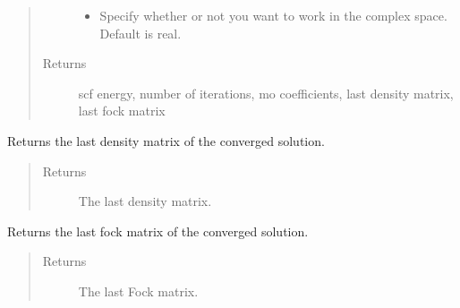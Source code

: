 \documentclass[letterpaper,10pt,english]{sphinxmanual}
\begin{document}
\begin{fulllineitems}
\begin{fulllineitems}
\begin{quote}
\begin{description}
\begin{itemize}
\item {} 
 \textendash{} Specify whether or not you want to work in the complex space. Default is real.

\end{itemize}

\item[{Returns}] \leavevmode
scf energy, number of iterations, mo coefficients, last density matrix, last fock matrix

\end{description}\end{quote}

\end{fulllineitems}


\begin{fulllineitems}
\label{\detokenize{RHF:hf.HartreeFock.RHF.MF.get_last_dens}}
Returns the last density matrix of the converged solution.
\begin{quote}\begin{description}
\item[{Returns}] \leavevmode
The last density matrix.

\end{description}\end{quote}

\end{fulllineitems}


\begin{fulllineitems}
\label{\detokenize{RHF:hf.HartreeFock.RHF.MF.get_last_fock}}
Returns the last fock matrix of the converged solution.
\begin{quote}\begin{description}
\item[{Returns}] \leavevmode
The last Fock matrix.

\end{description}\end{quote}

\end{fulllineitems}


\end{fulllineitems}
\end{document}
